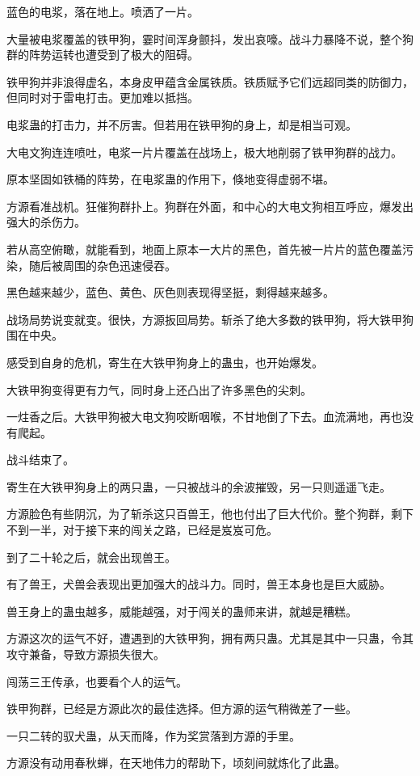 \begin{this_body}
蓝色的电浆，落在地上。喷洒了一片。

大量被电浆覆盖的铁甲狗，霎时间浑身颤抖，发出哀嚎。战斗力暴降不说，整个狗群的阵势运转也遭受到了极大的阻碍。

铁甲狗并非浪得虚名，本身皮甲蕴含金属铁质。铁质赋予它们远超同类的防御力，但同时对于雷电打击。更加难以抵挡。

电浆蛊的打击力，并不厉害。但若用在铁甲狗的身上，却是相当可观。

大电文狗连连喷吐，电浆一片片覆盖在战场上，极大地削弱了铁甲狗群的战力。

原本坚固如铁桶的阵势，在电浆蛊的作用下，倏地变得虚弱不堪。

方源看准战机。狂催狗群扑上。狗群在外面，和中心的大电文狗相互呼应，爆发出强大的杀伤力。

若从高空俯瞰，就能看到，地面上原本一大片的黑色，首先被一片片的蓝色覆盖污染，随后被周围的杂色迅速侵吞。

黑色越来越少，蓝色、黄色、灰色则表现得坚挺，剩得越来越多。

战场局势说变就变。很快，方源扳回局势。斩杀了绝大多数的铁甲狗，将大铁甲狗围在中央。

感受到自身的危机，寄生在大铁甲狗身上的蛊虫，也开始爆发。

大铁甲狗变得更有力气，同时身上还凸出了许多黑色的尖刺。

一炷香之后。大铁甲狗被大电文狗咬断咽喉，不甘地倒了下去。血流满地，再也没有爬起。

战斗结束了。

寄生在大铁甲狗身上的两只蛊，一只被战斗的余波摧毁，另一只则遥遥飞走。

方源脸色有些阴沉，为了斩杀这只百兽王，他也付出了巨大代价。整个狗群，剩下不到一半，对于接下来的闯关之路，已经是岌岌可危。

到了二十轮之后，就会出现兽王。

有了兽王，犬兽会表现出更加强大的战斗力。同时，兽王本身也是巨大威胁。

兽王身上的蛊虫越多，威能越强，对于闯关的蛊师来讲，就越是糟糕。

方源这次的运气不好，遭遇到的大铁甲狗，拥有两只蛊。尤其是其中一只蛊，令其攻守兼备，导致方源损失很大。

闯荡三王传承，也要看个人的运气。

铁甲狗群，已经是方源此次的最佳选择。但方源的运气稍微差了一些。

一只二转的驭犬蛊，从天而降，作为奖赏落到方源的手里。

方源没有动用春秋蝉，在天地伟力的帮助下，顷刻间就炼化了此蛊。


\end{this_body}
